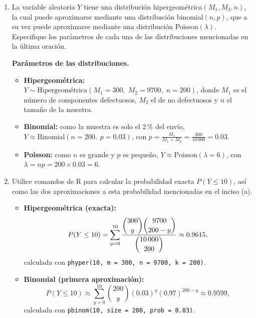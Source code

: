 \documentclass[10pt]{article}
\begin{document}
\begin{enumerate}[label=(\alph*)]
    \item La variable aleatoria $Y$ tiene una distribución hipergeométrica$(M_1, M_2, n)$, la cual puede aproximarse mediante una distribución binomial$(n, p)$, que a su vez puede aproximarse mediante una distribución Poisson$(\lambda)$. Especifique los parámetros de cada una de las distribuciones mencionadas en la última oración.

        \textbf{Parámetros de las distribuciones.}

        \begin{itemize}
            \item \textbf{Hipergeométrica:} $Y \sim \text{Hipergeométrica}(M_1 = 300,\; M_2 = 9700,\; n = 200)$, donde $M_1$ es el número de componentes defectuosos, $M_2$ el de no defectuosos y $n$ el tamaño de la muestra.

            \item \textbf{Binomial:} como la muestra es solo el 2\,\% del envío, $Y \approx \text{Binomial}(n = 200,\; p = 0.03)$, con $p = \frac{M_1}{M_1 + M_2} = \frac{300}{10\,000} = 0.03$.

            \item \textbf{Poisson:} como $n$ es grande y $p$ es pequeño, $Y \approx \text{Poisson}(\lambda = 6)$, con $\lambda = np = 200 \times 0.03 = 6$.
        \end{itemize}

    \item Utilice comandos de R para calcular la probabilidad exacta $P(Y \leq 10)$, así como las dos aproximaciones a esta probabilidad mencionadas en el inciso (a).
            
            \begin{itemize}
                \item \textbf{Hipergeométrica (exacta):}
                \[
                P(Y \leq 10) = \sum_{y=0}^{10} \frac{\dbinom{300}{y}\dbinom{9700}{200-y}}{\dbinom{10\,000}{200}} \approx 0.9615,
                \]
                calculada con \texttt{phyper(10, m = 300, n = 9700, k = 200)}.

                \item \textbf{Binomial (primera aproximación):}
                \[
                P(Y \leq 10) \approx \sum_{y=0}^{10} \binom{200}{y}(0.03)^{y}(0.97)^{200-y} \approx 0.9599,
                \]
                calculada con \texttt{pbinom(10, size = 200, prob = 0.03)}.


\end{itemize}
\end{enumerate}
\end{document}
